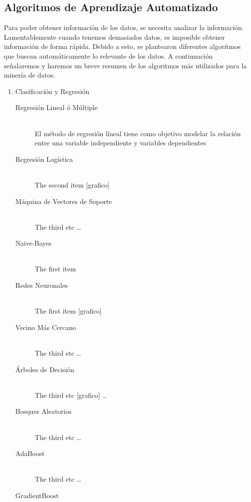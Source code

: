 \subsection{Algoritmos de Aprendizaje Automatizado}
Para poder obtener información de los datos, se necesita analizar la información. Lamentablemente cuando tenemos demasiados datos, es imposible obtener información de forma rápida. Debido a esto, se plantearon diferentes algoritmos que buscan automáticamente lo relevante de los datos.
A continuación señalaremos y haremos un breve resumen de los algoritmos más utilizados para la minería de datos.



\begin{enumerate}
  \item Clasificación y Regresión
    \begin{description}
      \item[Regresión Lineal ó Múltiple] \hfill \\
      El método de regresión líneal tiene como objetivo modelar la relación entre una variable independiente y variables dependientes
      \item[Regresión Logística] \hfill \\
      The second item [grafico]
      \item[Máquina de Vectores de Soporte] \hfill \\
      The third etc \ldots
      \item[Naive-Bayes] \hfill \\
      The first item
      \item[Redes Neuronales] \hfill \\
      The first item [grafico]
      \item[Vecino Más Cercano] \hfill \\
      The third etc \ldots
      \item[Árboles de Decisión] \hfill \\
      The third etc [grafico] \ldots
      \item[Bosques Aleatorios] \hfill \\
      The third etc \ldots
      \item[AdaBoost] \hfill \\
      The third etc \ldots
      \item[GradientBoost] \hfill \\

\end{description}
\end{enumerate}
